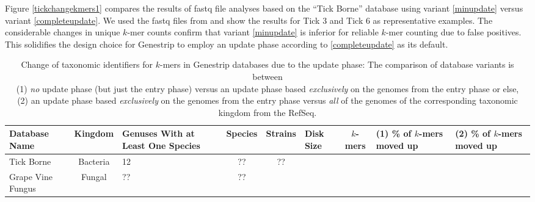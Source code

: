 \documentclass[letterpaper,11pt,leqno]{article}
\begin{document}
Figure \ref{tickchangekmers1} compares the results of fastq file analyses based on the \enquote{Tick Borne} database using variant \ref{minupdate} versus variant \ref{completeupdate}. We used the fastq files from \cite{nanoporeticks} and show the results for Tick 3 and Tick 6 as representative examples. The considerable changes in unique $k$-mer counts confirm that variant \ref{minupdate} is inferior for reliable $k$-mer counting due to false positives. This solidifies the design choice for Genestrip to employ an update phase according to \ref{completeupdate} as its default.

\begin{table}[h]
\centering
\begin{tabular}{p{1.5cm}|c|p{1.5cm}|c|c|p{1cm}|c|p{1cm}|p{1cm}}
Database Name & Kingdom & Genuses With at Least One Species & Species & Strains & Disk Size &$k$-mers & (1) \% of $k$-mers moved up &  (2) \% of $k$-mers moved up \\
  \hline
  \hline
 Tick Borne & Bacteria & 12 & ?? & ?? \\
  \hline
 Grape Vine Fungus & Fungal & ?? & ??
\end{tabular}
\caption{Change of taxonomic identifiers for $k$-mers in Genestrip databases due to the update phase: The comparison of database variants is between \\
(1) \emph{no} update phase (but just the entry phase) versus an update phase based \emph{exclusively} on the genomes from the entry phase or else, \\
(2)	an update phase based \emph{exclusively} on the genomes from the entry phase versus \emph{all} of the genomes of the corresponding taxonomic kingdom from the RefSeq.}
\label{updaterelevance}
\end{table}
\end{document}
